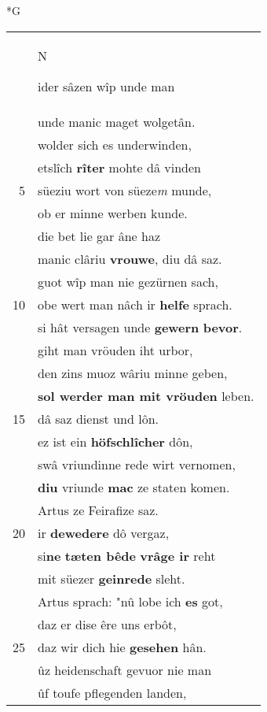 \documentclass[8pt,a4paper,notitlepage]{article}
\begin{document}
\newpage
\begin{table}[ht]
\begin{minipage}[t]{0.5\linewidth}
\small
\begin{center}*G
\end{center}
\begin{tabular}{rl}
 & \begin{large}N\end{large}ider sâzen wîp unde man\\ 
 & unde manic maget wolgetân.\\ 
 & wolder sich es underwinden,\\ 
 & etslîch \textbf{rîter} mohte dâ vinden\\ 
5 & süeziu wort von süeze\textit{m} munde,\\ 
 & ob er minne werben kunde.\\ 
 & die bet lie gar âne haz\\ 
 & manic clâriu \textbf{vrouwe}, diu dâ saz.\\ 
 & guot wîp man nie gezürnen sach,\\ 
10 & obe wert man nâch ir \textbf{helfe} sprach.\\ 
 & si hât versagen unde \textbf{gewern} \textbf{bevor}.\\ 
 & giht man vröuden iht urbor,\\ 
 & den zins muoz wâriu minne geben,\\ 
 & \textbf{sol werder man mit vröuden} leben.\\ 
15 & dâ saz dienst und lôn.\\ 
 & ez ist ein \textbf{höfschlîcher} dôn,\\ 
 & swâ vriundinne rede wirt vernomen,\\ 
 & \textbf{diu} vriunde \textbf{mac} ze staten komen.\\ 
 & Artus ze Feirafize saz.\\ 
20 & ir \textbf{dewedere} dô vergaz,\\ 
 & si\textbf{ne} \textbf{tæten bêde} \textbf{vrâge ir} reht\\ 
 & mit süezer \textbf{geinrede} sleht.\\ 
 & Artus sprach: "nû lobe ich \textbf{es} got,\\ 
 & daz er dise êre uns erbôt,\\ 
25 & daz wir dich hie \textbf{gesehen} hân.\\ 
 & ûz heidenschaft gevuor nie man\\ 
 & ûf toufe pflegenden landen,\\ 

\end{tabular}
\end{minipage}
\end{table}
\end{document}
